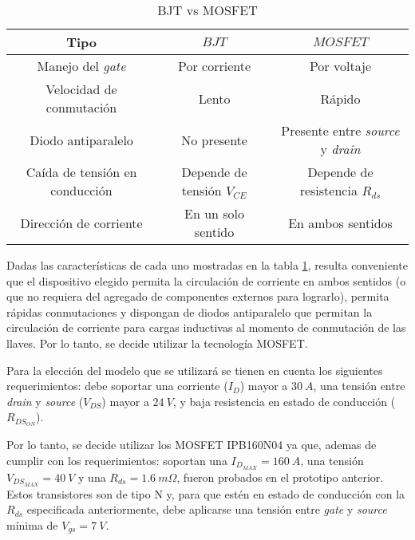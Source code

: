 \begin{table}[H]
	\begin{center}
		\begin{tabular}{| c | c | c |}
			\hline
			Tipo & $BJT$ & $MOSFET$\\ \hline
			Manejo del \textsl{gate} & Por corriente & Por voltaje \\ \hline 
			Velocidad de conmutación & Lento & Rápido \\ \hline 
			Diodo antiparalelo & No presente & Presente entre \textsl{source} y \textsl{drain} \\ \hline 
			Caída de tensión en conducción & Depende de tensión  $V_{CE}$ & Depende de resistencia $R_{ds}$ \\ \hline 
			Dirección de corriente & En un solo sentido & En ambos sentidos \\ \hline 
		\end{tabular}
		\caption{BJT vs MOSFET}
		\label{tab_MOSFETvsBJT}
	\end{center}
\end{table}

Dadas las características de cada uno mostradas en la tabla \ref{tab_MOSFETvsBJT}, resulta conveniente que el dispositivo elegido permita la circulación de corriente en ambos sentidos (o que no requiera del agregado de componentes externos para lograrlo), permita rápidas conmutaciones y dispongan de diodos antiparalelo que permitan la circulación de corriente para cargas inductivas al momento de conmutación de las llaves. Por lo tanto, se decide utilizar la tecnología MOSFET.

Para la elección del modelo que se utilizará se tienen en cuenta los siguientes requerimientos: debe soportar una corriente ($I_{D}$) mayor a $30\:A$, una tensión entre \textsl{drain} y \textsl{source} ($V_{DS}$) mayor a $24\:V$, y baja resistencia en estado de conducción ($R_{DS_{ON}}$).

Por lo tanto, se decide utilizar los MOSFET IPB160N04 \cite{IPB160N04} ya que, ademas de cumplir con los requerimientos: soportan una $I_{D_{MAX}}=160\:A$, una tensión $V_{DS_{MAX}} = 40\:V$ y una $R_{ds} = 1.6 \:m \Omega$, fueron probados en el prototipo anterior. Estos transistores son de tipo N y, para que estén en estado de conducción con la $R_{ds}$ especificada anteriormente, debe aplicarse una tensión entre \textsl{gate} y \textsl{source} mínima de $V_{gs}= 7\:V$.

